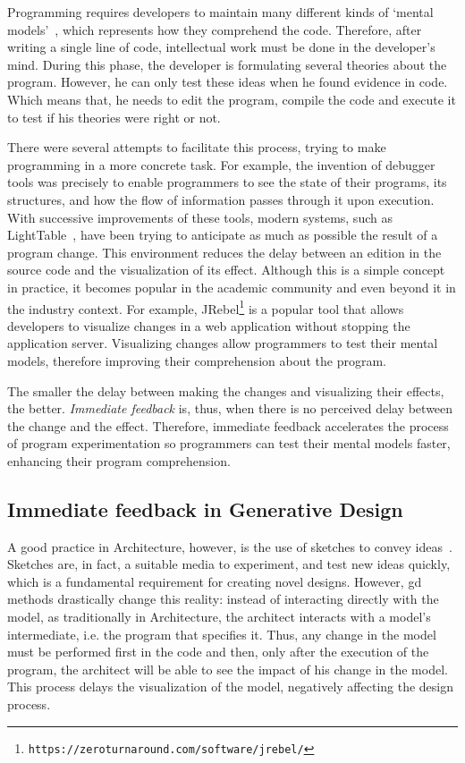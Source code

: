 Programming requires developers to maintain many different kinds of ‘mental models'~\citep{brooks1977towards,robins2003learning}, which represents how they comprehend the code. Therefore, after writing a single line of code, intellectual work must be done in the developer's mind. During this phase, the developer is formulating several theories about the program. However, he can only test these ideas when he found evidence in code. Which means that, he needs to edit the program, compile the code and execute it to test if his theories were right or not.

There were several attempts to facilitate this process, trying to make programming in a more concrete task. For example, the invention of debugger tools was precisely to enable programmers to see the state of their programs, its structures, and how the flow of information passes through it upon execution. With successive improvements of these tools, modern systems, such as LightTable~\citep{lighttable}, have been trying to anticipate as much as possible the result of a program change. This environment reduces the delay between an edition in the source code and the visualization of its effect. Although this is a simple concept in practice, it becomes popular in the academic community and even beyond it in the industry context. For example, JRebel\footnote{\texttt{https://zeroturnaround.com/software/jrebel/}} is a popular tool that allows developers to visualize changes in a web application without stopping the application server. Visualizing changes allow programmers to test their mental models, therefore improving their comprehension about the program.

The smaller the delay between making the changes and visualizing their effects, the better. \textit{Immediate feedback} is, thus, when there is no perceived delay between the change and the effect. Therefore, immediate feedback accelerates the process of program experimentation so programmers can test their mental models faster, enhancing their program comprehension.

\subsection{Immediate feedback in Generative Design}

A good practice in Architecture, however, is the use of sketches to convey ideas~\citep{do2001thinking}. Sketches are, in fact, a suitable media to experiment, and test new ideas quickly, which is a fundamental requirement for creating novel designs. However, \gls{gd} methods drastically change this reality: instead of interacting directly with the model, as traditionally in Architecture, the architect interacts with a model's intermediate, i.e. the program that specifies it. Thus, any change in the model must be performed first in the code and then, only after the execution of the program, the architect will be able to see the impact of his change in the model. This process delays the visualization of the model, negatively affecting the design process.


